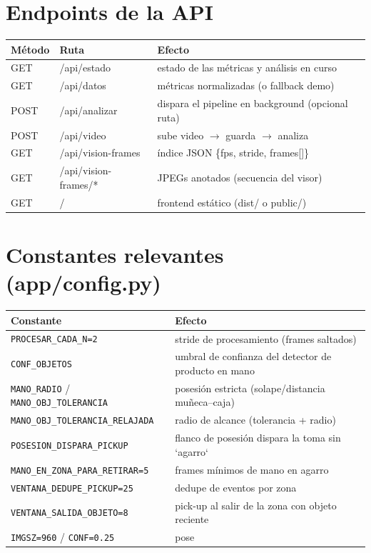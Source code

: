 \documentclass[11pt,a4paper]{article}
\begin{document}
\section{Endpoints de la API}
\begin{center}
\begin{tabular}{@{}lll@{}}
\toprule
\textbf{Método} & \textbf{Ruta} & \textbf{Efecto}\\
\midrule
GET & /api/estado & estado de las métricas y análisis en curso\\
GET & /api/datos & métricas normalizadas (o fallback demo)\\
POST & /api/analizar & dispara el pipeline en background (opcional ruta)\\
POST & /api/video & sube video $\rightarrow$ guarda $\rightarrow$ analiza\\
GET & /api/vision-frames & índice JSON \{fps, stride, frames[]\}\\
GET & /api/vision-frames/* & JPEGs anotados (secuencia del visor)\\
GET & / & frontend estático (dist/ o public/)\\
\bottomrule
\end{tabular}
\end{center}

\section{Constantes relevantes (app/config.py)}
\begin{center}
\begin{tabular}{@{}ll@{}}
\toprule
\textbf{Constante} & \textbf{Efecto}\\
\midrule
\texttt{PROCESAR\_CADA\_N=2} & stride de procesamiento (frames saltados)\\
\texttt{CONF\_OBJETOS} & umbral de confianza del detector de producto en mano\\
\texttt{MANO\_RADIO} / \texttt{MANO\_OBJ\_TOLERANCIA} & posesión estricta (solape/distancia muñeca--caja)\\
\texttt{MANO\_OBJ\_TOLERANCIA\_RELAJADA} & radio de alcance (tolerancia + radio)\\
\texttt{POSESION\_DISPARA\_PICKUP} & flanco de posesión dispara la toma sin `agarro`\\
\texttt{MANO\_EN\_ZONA\_PARA\_RETIRAR=5} & frames mínimos de mano en agarro\\
\texttt{VENTANA\_DEDUPE\_PICKUP=25} & dedupe de eventos por zona\\
\texttt{VENTANA\_SALIDA\_OBJETO=8} & pick-up al salir de la zona con objeto reciente\\
\texttt{IMGSZ=960} / \texttt{CONF=0.25} & pose\\
\bottomrule
\end{tabular}
\end{center}
\end{document}
